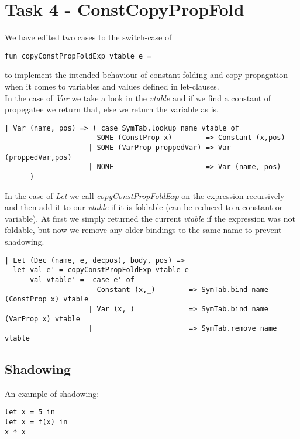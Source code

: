 \documentclass{article}
\begin{document}
\newpage

\section{Task 4 - ConstCopyPropFold}
We have edited two cases to the switch-case of 
\begin{lstlisting}
fun copyConstPropFoldExp vtable e =
\end{lstlisting}
to implement the intended behaviour of constant folding and copy propagation when it comes to variables and values defined in let-clauses.\\
In the case of \textit{Var} we take a look in the \textit{vtable} and if we find a constant of propegatee we return that, else we return the variable as is.\\
\begin{lstlisting}
| Var (name, pos) => ( case SymTab.lookup name vtable of
                      SOME (ConstProp x)        => Constant (x,pos) 
                    | SOME (VarProp proppedVar) => Var (proppedVar,pos)
                    | NONE                      => Var (name, pos)
      )
\end{lstlisting}

\noindent In the case of \textit{Let} we call \textit{copyConstPropFoldExp} on the expression recursively and then add it to our \textit{vtable} if it is foldable (can be reduced to a constant or variable). At first we simply returned the current \textit{vtable} if the expression was not foldable, but now we remove any older bindings to the same name to prevent shadowing.

\begin{lstlisting}
| Let (Dec (name, e, decpos), body, pos) => 
  let val e' = copyConstPropFoldExp vtable e
      val vtable' =  case e' of
                      Constant (x,_)        => SymTab.bind name (ConstProp x) vtable 
                    | Var (x,_)             => SymTab.bind name (VarProp x) vtable
                    | _                     => SymTab.remove name vtable
\end{lstlisting}

\subsection{Shadowing}
\noindent An example of shadowing:

\begin{lstlisting}
let x = 5 in
let x = f(x) in
x * x
\end{lstlisting}
\end{document}
